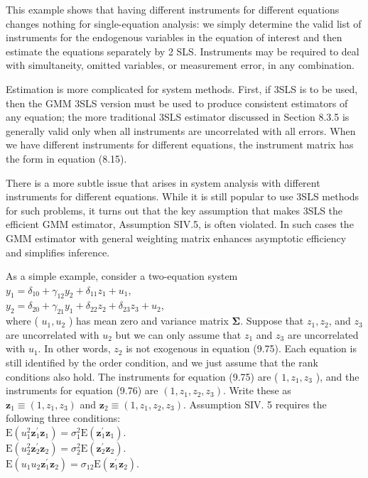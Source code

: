 \documentclass[10pt]{article}
\begin{document}
This example shows that having different instruments for different equations changes nothing for single-equation analysis: we simply determine the valid list of instruments for the endogenous variables in the equation of interest and then estimate the equations separately by 2 SLS. Instruments may be required to deal with simultaneity, omitted variables, or measurement error, in any combination.

Estimation is more complicated for system methods. First, if 3SLS is to be used, then the GMM 3SLS version must be used to produce consistent estimators of any equation; the more traditional 3SLS estimator discussed in Section 8.3.5 is generally valid only when all instruments are uncorrelated with all errors. When we have different instruments for different equations, the instrument matrix has the form in equation (8.15).

There is a more subtle issue that arises in system analysis with different instruments for different equations. While it is still popular to use 3SLS methods for such problems, it turns out that the key assumption that makes 3SLS the efficient GMM estimator, Assumption SIV.5, is often violated. In such cases the GMM estimator with general weighting matrix enhances asymptotic efficiency and simplifies inference.

As a simple example, consider a two-equation system\\
$y_{1}=\delta_{10}+\gamma_{12} y_{2}+\delta_{11} z_{1}+u_{1}$,\\
$y_{2}=\delta_{20}+\gamma_{21} y_{1}+\delta_{22} z_{2}+\delta_{23} z_{3}+u_{2}$,\\
where ( $u_{1}, u_{2}$ ) has mean zero and variance matrix $\boldsymbol{\Sigma}$. Suppose that $z_{1}, z_{2}$, and $z_{3}$ are uncorrelated with $u_{2}$ but we can only assume that $z_{1}$ and $z_{3}$ are uncorrelated with $u_{1}$. In other words, $z_{2}$ is not exogenous in equation (9.75). Each equation is still identified by the order condition, and we just assume that the rank conditions also hold. The instruments for equation (9.75) are ( $1, z_{1}, z_{3}$ ), and the instruments for equation (9.76) are $\left(1, z_{1}, z_{2}, z_{3}\right)$. Write these as $\mathbf{z}_{1} \equiv\left(1, z_{1}, z_{3}\right)$ and $\mathbf{z}_{2} \equiv\left(1, z_{1}, z_{2}, z_{3}\right)$. Assumption SIV. 5 requires the following three conditions:\\
$\mathrm{E}\left(u_{1}^{2} \mathbf{z}_{1}^{\prime} \mathbf{z}_{1}\right)=\sigma_{1}^{2} \mathrm{E}\left(\mathbf{z}_{1}^{\prime} \mathbf{z}_{1}\right)$.\\
$\mathrm{E}\left(u_{2}^{2} \mathbf{z}_{2}^{\prime} \mathbf{z}_{2}\right)=\sigma_{2}^{2} \mathrm{E}\left(\mathbf{z}_{2}^{\prime} \mathbf{z}_{2}\right)$.\\
$\mathrm{E}\left(u_{1} u_{2} \mathbf{z}_{1}^{\prime} \mathbf{z}_{2}\right)=\sigma_{12} \mathrm{E}\left(\mathbf{z}_{1}^{\prime} \mathbf{z}_{2}\right)$.
\end{document}
